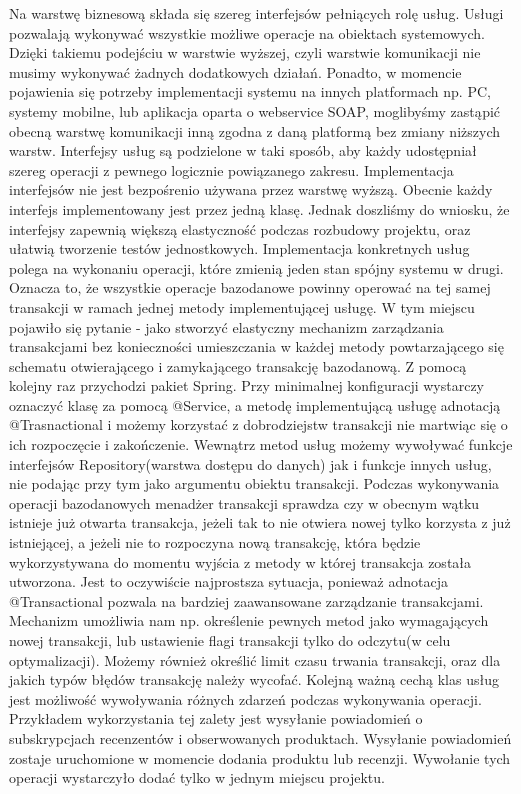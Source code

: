 Na warstwę biznesową składa się szereg interfejsów pełniących rolę usług. Usługi pozwalają wykonywać wszystkie możliwe operacje na obiektach systemowych. Dzięki takiemu podejściu w warstwie wyższej, czyli warstwie komunikacji nie musimy wykonywać żadnych dodatkowych działań. Ponadto, w momencie pojawienia się potrzeby implementacji systemu na innych platformach np. PC, systemy mobilne, lub aplikacja oparta o webservice SOAP, moglibyśmy zastąpić obecną warstwę komunikacji inną zgodna z daną platformą bez zmiany niższych warstw.
Interfejsy usług są podzielone w taki sposób, aby każdy udostępniał szereg operacji z pewnego logicznie powiązanego zakresu. Implementacja interfejsów nie jest bezpośrenio używana przez warstwę wyższą. Obecnie każdy interfejs implementowany jest przez jedną klasę. Jednak doszliśmy do wniosku, że interfejsy zapewnią większą elastyczność podczas rozbudowy projektu, oraz ułatwią tworzenie testów jednostkowych.
Implementacja konkretnych usług polega na wykonaniu operacji, które zmienią jeden stan spójny systemu w drugi. Oznacza to, że wszystkie operacje bazodanowe powinny operować na tej samej transakcji w ramach jednej metody implementującej usługę. W tym miejscu pojawiło się pytanie - jako stworzyć elastyczny mechanizm zarządzania transakcjami bez konieczności umieszczania w każdej metody powtarzającego się schematu otwierającego i zamykającego transakcję bazodanową. Z pomocą kolejny raz przychodzi pakiet Spring. Przy minimalnej konfiguracji wystarczy oznaczyć klasę za pomocą @Service, a metodę implementującą usługę adnotacją @Trasnactional i możemy korzystać z dobrodziejstw transakcji nie martwiąc się o ich rozpoczęcie i zakończenie. Wewnątrz metod usług możemy wywoływać funkcje interfejsów Repository(warstwa dostępu do danych) jak i funkcje innych usług, nie podając przy tym jako argumentu obiektu transakcji. Podczas wykonywania operacji bazodanowych menadżer transakcji sprawdza czy w obecnym wątku istnieje już otwarta transakcja, jeżeli tak to nie otwiera nowej tylko korzysta z już istniejącej, a jeżeli nie to rozpoczyna nową transakcję, która będzie wykorzystywana do momentu wyjścia z metody w której transakcja została utworzona. Jest to oczywiście najprostsza sytuacja, ponieważ adnotacja @Transactional pozwala na bardziej zaawansowane zarządzanie transakcjami. Mechanizm umożliwia nam np. określenie pewnych metod jako wymagających nowej transakcji, lub ustawienie flagi transakcji tylko do odczytu(w celu optymalizacji). Możemy również określić limit czasu trwania transakcji, oraz dla jakich typów błędów transakcję należy wycofać. 
Kolejną ważną cechą klas usług jest możliwość wywoływania różnych zdarzeń podczas wykonywania operacji. Przykładem wykorzystania tej zalety jest wysyłanie powiadomień o subskrypcjach recenzentów i obserwowanych produktach. Wysyłanie powiadomień zostaje uruchomione w momencie dodania produktu lub recenzji. Wywołanie tych operacji wystarczyło dodać tylko w jednym miejscu projektu.

